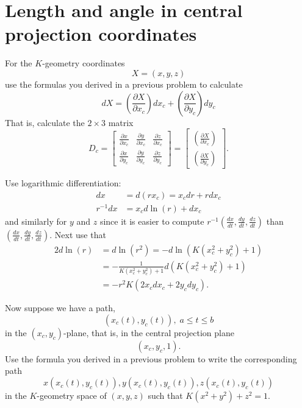 \documentclass{ximera}
\begin{document}
\section{Length and angle in central projection coordinates}

\begin{problem}
\label{33}For the $K$-geometry coordinates%
\[
X=\left(  x,y,z\right)
\]
use the formulas you derived in a previous problem to calculate%
\[
dX=\left(  \frac{\partial X}{\partial x_{c}}\right)  dx_{c}+\left(
\frac{\partial X}{\partial y_{c}}\right)  dy_{c}%
\]
That is, calculate the $2\times3$ matrix%
\[
D_{c}=\begin{bmatrix}
\frac{\partial x}{\partial x_{c}} & \frac{\partial y}{\partial x_{c}} &
\frac{\partial z}{\partial x_{c}}\\
\frac{\partial x}{\partial y_{c}} & \frac{\partial y}{\partial y_{c}} &
\frac{\partial z}{\partial y_{c}}%
\end{bmatrix} =\begin{bmatrix}
\left(  \frac{\partial X}{\partial x_{c}}\right) \\
\left(  \frac{\partial X}{\partial y_{c}}\right)
\end{bmatrix} .
\]
\begin{hint}
Use logarithmic differentiation:%
\begin{align*}
dx  &  =d\left(  rx_{c}\right)  =x_{c}dr+rdx_{c}\\
r^{-1}dx  &  =x_{c}d\ln\left(  r\right)  +dx_{c}%
\end{align*}
and similarly for $y$ and $z$ since it is easier to compute $r^{-1}\left(
\frac{dx}{dt},\frac{dy}{dt},\frac{dz}{dt}\right)  $ than $\left(  \frac
{dx}{dt},\frac{dy}{dt},\frac{dz}{dt}\right)  $. Next use that%
\begin{align*}
2d\ln\left(  r\right)   &  =d\ln\left(  r^{2}\right)
=-d\ln\left(  K\left(  x_{c}^{2}+y_{c}^{2}\right)  +1\right) \\
&  =-\frac{1}{K\left(  x_{c}^{2}+y_{c}^{2}\right)  +1}d\left(  K\left(
x_{c}^{2}+y_{c}^{2}\right)  +1\right) \\
&  =-r^{2}K\left(  2x_{c}dx_{c}+2y_{c}dy_{c}\right)  .
\end{align*}
\end{hint}
\end{problem}

\begin{problem}
\label{prev}Now suppose we have a path,%
\[
\left(  x_{c}\left(  t\right)  ,y_{c}\left(  t\right)  \right)  ,\;a\leq t\leq
b
\]
in the $\left(  x_{c},y_{c}\right)  $-plane, that is, in the central
projection plane%
\[
\left(  x_{c},y_{c},1\right)  .
\]
Use the formula you derived in a previous problem to write the
corresponding path%
\[
x\left(  x_{c}\left(  t\right)  ,y_{c}\left(  t\right)  \right)  ,y\left(
x_{c}\left(  t\right)  ,y_{c}\left(  t\right)  \right)  ,z\left(  x_{c}\left(
t\right)  ,y_{c}\left(  t\right)  \right)
\]
in the $K$-geometry space of $\left(  x,y,z\right)  $ such that $K\left(
x^{2}+y^{2}\right)  +z^{2}=1$.
\end{problem}
\end{document}
